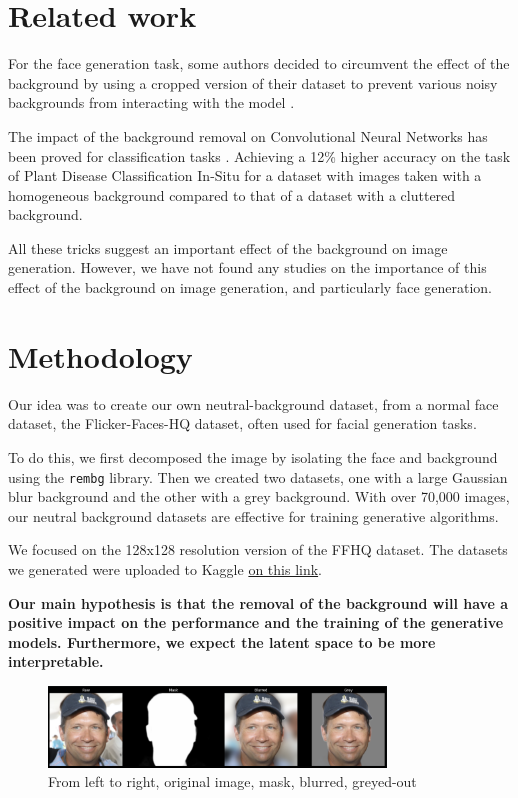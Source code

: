 \documentclass{article}
\begin{document}
\section{Related work}

\quad For the face generation task, some authors decided to circumvent the effect of the background by using a cropped version of their dataset to prevent various noisy backgrounds from interacting with the model \cite{gauthier2014conditional}. 

The impact of the background removal on Convolutional Neural Networks has been proved for classification tasks \cite{kcyin2021impact}. Achieving a 12\% higher accuracy on the task of Plant Disease Classification In-Situ for a dataset with images taken with a homogeneous background compared to that of a dataset with a cluttered background.

All these tricks suggest an important effect of the background on image generation. 
However, we have not found any studies on the importance of this effect of the background on image generation, and particularly face generation.

\section{Methodology}

\quad Our idea was to create our own neutral-background dataset, from a normal face dataset, the Flicker-Faces-HQ dataset, often used for facial generation tasks. 

To do this, we first decomposed the image by isolating the face and background using the \texttt{rembg} library. 
Then we created two datasets, one with a large Gaussian blur background and the other with a grey background. 
With over 70,000 images, our neutral background datasets are effective for training generative algorithms.

We focused on the 128x128 resolution version of the FFHQ dataset.
The datasets we generated were uploaded to Kaggle \hyperlink{https://www.kaggle.com/thomaskientz/datasets}{on this link}.

\textbf{Our main hypothesis is that the removal of the background will have a positive impact on the performance and the training of the generative models. 
Furthermore, we expect the latent space to be more interpretable.}

\begin{figure}[H]
    \centering
    \includegraphics[width=0.8\textwidth]{images/mask.png}
    \caption{From left to right, original image, mask, blurred, greyed-out}
\end{figure}
\end{document}
